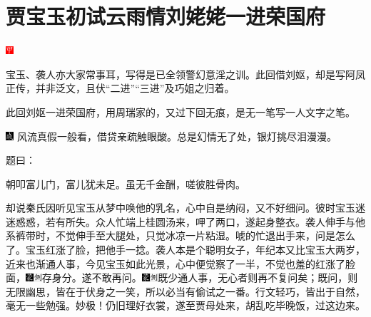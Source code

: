 

\chapter{贾宝玉初试云雨情\hspace{.5em}刘姥姥一进荣国府}

\includegraphics[width=3mm]{../Images/00002}{\kaishu 宝玉、袭人亦大家常事耳，写得是已全领警幻意淫之训。此回借刘妪，却是写阿凤正传，并非泛文，且伏``二进''``三进''及巧姐之归着。

此回刘妪一进荣国府，用周瑞家的，又过下回无痕，是无一笔写一人文字之笔。

\includegraphics[width=3mm]{../Images/00005}  \kaishu 风流真假一般看，借贷亲疏触眼酸。总是幻情无了处，银灯挑尽泪漫漫。}

题曰：

朝叩富儿门，富儿犹未足。虽无千金酬，嗟彼胜骨肉。

却说秦氏因听见宝玉从梦中唤他的乳名，心中自是纳闷，又不好细问。彼时宝玉迷迷惑惑，若有所失。众人忙端上桂圆汤来，呷了两口，遂起身整衣。袭人伸手与他系裤带时，不觉伸手至大腿处，只觉冰凉一片粘湿。唬的忙退出手来，问是怎么了。宝玉红涨了脸，把他手一捻。袭人本是个聪明女子，年纪本又比宝玉大两岁，近来也渐通人事，今见宝玉如此光景，心中便觉察了一半，不觉也羞的红涨了脸面，{\includegraphics[width=3mm]{../Images/00006}\includegraphics[width=3mm]{../Images/00011}\footnotesize \kaishu 存身分。}遂不敢再问。{\includegraphics[width=3mm]{../Images/00006}\includegraphics[width=3mm]{../Images/00011}\footnotesize \kaishu 既少通人事，无心者则再不复问矣；既问，则无限幽思，皆在于伏身之一笑，所以必当有偷试之一番。行文轻巧，皆出于自然，毫无一些勉强。妙极！}仍旧理好衣裳，遂至贾母处来，胡乱吃毕晚饭，过这边来。

